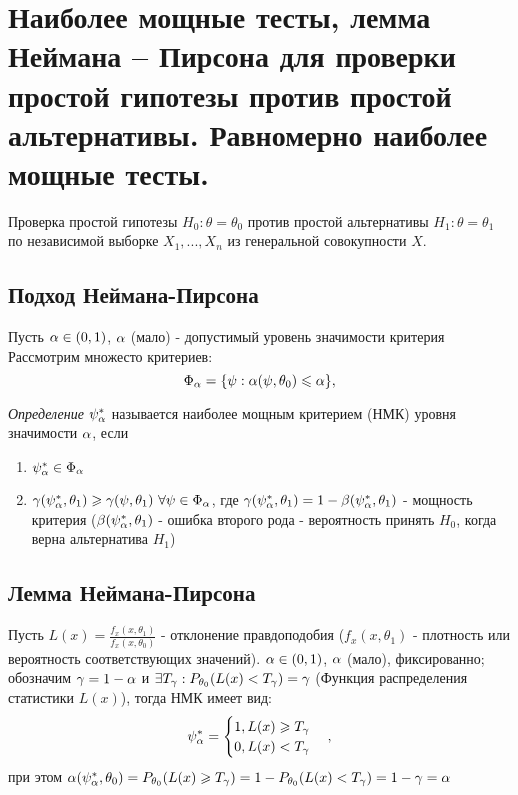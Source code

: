 \section{Наиболее мощные тесты, лемма Неймана – Пирсона для проверки простой гипотезы против простой
альтернативы. Равномерно наиболее мощные тесты.}

Проверка простой гипотезы $H_0 : \theta = \theta_0$ против простой альтернативы $H_1 : \theta = \theta_1$ по независимой выборке $X_1, ..., X_n$ из генеральной совокупности $X$.

\subsection{Подход Неймана-Пирсона}
Пусть $\alpha \in (0, 1)$, $\alpha$ (мало) - допустимый уровень значимости критерия
Рассмотрим множесто критериев:
\[
    \Phi_{\alpha} = \{ \psi : \alpha(\psi, \theta_0) \leqslant \alpha \}\\
,\]

\textit{Определение} $\psi_{\alpha}^{*}$ называется наиболее мощным критерием (НМК) уровня значимости $\alpha$, если
\begin{enumerate}
  \item $\psi_{\alpha}^{*} \in \Phi_{\alpha}$
  \item $\gamma(\psi_{\alpha}^{*}, \theta_1) \geqslant \gamma(\psi, \theta_1)~\forall \psi \in \Phi_{\alpha}$,
  где $\gamma(\psi_{\alpha}^{*}, \theta_1) = 1 - \beta(\psi_{\alpha}^{*}, \theta_1)$ - мощность критерия ($\beta(\psi_{\alpha}^{*}, \theta_1)$ - ошибка второго рода - вероятность принять $H_0$, когда верна альтернатива $H_1$)
\end{enumerate}

\subsection{Лемма Неймана-Пирсона}

Пусть $L(x) = \frac{f_x(x, \theta_1)}{f_x(x, \theta_0)}$ - отклонение правдоподобия ($f_x(x, \theta_1)$ - плотность или вероятность соответствующих значений).
$\alpha \in (0, 1)$, $\alpha$ (мало), фиксированно; обозначим $\gamma = 1 - \alpha$ и $\exists T_{\gamma}: P_{\theta_0}(L(x) < T_{\gamma}) = \gamma$ (Функция распределения статистики $L(x)$), тогда НМК имеет вид:
\[
  \psi_{\alpha}^{*} =
  \begin{cases}
    1, L(x) \geqslant T_{\gamma} \\
    0, L(x) < T_{\gamma}
  \end{cases}
,\] при этом $\alpha(\psi_{\alpha}^{*}, \theta_0) = P_{\theta_0}(L(x) \geqslant T_{\gamma}) = 1 - P_{\theta_0}(L(x) < T_{\gamma}) = 1 - \gamma = \alpha$

